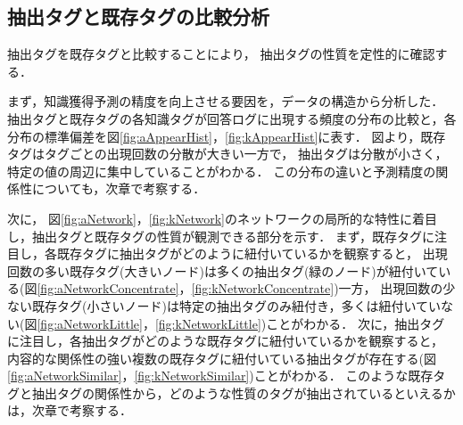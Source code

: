 \subsection{抽出タグと既存タグの比較分析}
抽出タグを既存タグと比較することにより，
抽出タグの性質を定性的に確認する．



まず，知識獲得予測の精度を向上させる要因を，データの構造から分析した．
抽出タグと既存タグの各知識タグが回答ログに出現する頻度の分布の比較と，各分布の標準偏差を図\ref{fig:aAppearHist}，\ref{fig:kAppearHist}に表す．
図より，既存タグはタグごとの出現回数の分散が大きい一方で，
抽出タグは分散が小さく，特定の値の周辺に集中していることがわかる．
この分布の違いと予測精度の関係性についても，次章で考察する．

\begin{figure}[htb]
\begin{center}
\hspace*{-40pt}
\end{center}
\end{figure}

次に，
図\ref{fig:aNetwork}，\ref{fig:kNetwork}のネットワークの局所的な特性に着目し，抽出タグと既存タグの性質が観測できる部分を示す．
まず，既存タグに注目し，各既存タグに抽出タグがどのように紐付いているかを観察すると，
出現回数の多い既存タグ(大きいノード)は多くの抽出タグ(緑のノード)が紐付いている(図\ref{fig:aNetworkConcentrate}，\ref{fig:kNetworkConcentrate})一方，
出現回数の少ない既存タグ(小さいノード)は特定の抽出タグのみ紐付き，多くは紐付いていない(図\ref{fig:aNetworkLittle}，\ref{fig:kNetworkLittle})ことがわかる．
次に，抽出タグに注目し，各抽出タグがどのような既存タグに紐付いているかを観察すると，
内容的な関係性の強い複数の既存タグに紐付いている抽出タグが存在する(図\ref{fig:aNetworkSimilar}，\ref{fig:kNetworkSimilar})ことがわかる．	
このような既存タグと抽出タグの関係性から，どのような性質のタグが抽出されているといえるかは，次章で考察する．

